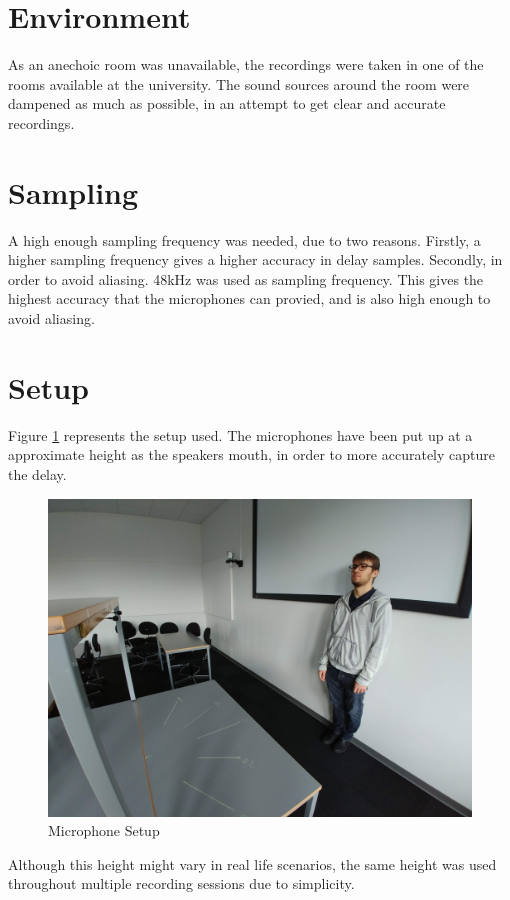 \section{Environment}
As an anechoic room was unavailable, the recordings were taken in one of the rooms available at the university. 
The sound sources around the room were dampened as much as possible, in an attempt to get clear and accurate 
recordings.
\section{Sampling} 
A high enough sampling frequency was needed, due to two reasons. Firstly, a higher sampling frequency
gives a higher accuracy in delay samples. Secondly, in order to avoid aliasing. 48kHz was used
as sampling frequency. This gives the highest accuracy that the microphones can provied, and is also
high enough to avoid aliasing.
\newpage
\section{Setup}
Figure \ref{fig:RanzvanRecSetup} represents the setup used. The microphones have been put up at a
approximate height as the speakers mouth, in order to more accurately capture the delay.

\begin{figure}[htp]
	\centering
	\includegraphics[width=\textwidth]{Illustrations/razvanWithSetup.jpg}
	\caption{Microphone Setup}
	\label{fig:RanzvanRecSetup}
\end{figure}

Although this height might vary in real life scenarios, the same height was used throughout multiple recording
sessions due to simplicity.

